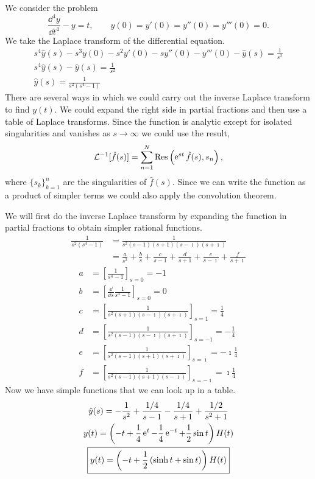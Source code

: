 {%
\begin{Solution}
  \label{solution y''''-y=t}
  We consider the problem
  \[
  \frac{\dd^4 y}{\dd t^4} - y = t, \qquad
  y(0) = y'(0) = y''(0) = y'''(0) = 0.
  \]
  We take the Laplace transform of the differential equation.
  \begin{gather*}
    s^4 \hat{y}(s) - s^3 y(0) - s^2 y'(0) - s y''(0) - y'''(0) - \hat{y}(s)
    = \frac{1}{s^2} \\
    s^4 \hat{y}(s) - \hat{y}(s) = \frac{1}{s^2} \\
    \hat{y}(s) = \frac{1}{s^2 (s^4 - 1)}
  \end{gather*}
  There are several ways in which we could carry out the inverse Laplace
  transform to find $y(t)$.  We could expand the right side in
  partial fractions and then use a table of Laplace transforms.
  Since the function is analytic except for isolated singularities and
  vanishes as $s \to \infty$ we could use the result,
  \[
  \mathcal{L}^{-1} [\hat{f}(s)]
  = \sum_{n = 1}^N \mathop{\mathrm{Res}}\nolimits \left( \mathop{\mathrm{e}}\nolimits^{s t} \hat{f}(s), s_n \right),
  \]
  where $\{s_k\}_{k=1}^n$ are the singularities of $\hat{f}(s)$.
  Since we can write the function as a product of simpler terms we could also
  apply the convolution theorem.

  We will first do the inverse Laplace transform by expanding the function 
  in partial fractions to obtain simpler rational functions.
  \begin{align*}
    \frac{1}{ s^2 (s^4 - 1) }
    &= \frac{1}{ s^2 (s - 1) (s + 1) (s - \imath) (s + \imath) } \\
    &= \frac{a}{s^2} + \frac{b}{s}
    + \frac{c}{ s - 1 } + \frac{d}{ s + 1 }
    + \frac{e}{ s - \imath } + \frac{f}{ s + \imath }
  \end{align*}
  \begin{align*}
    a &= \left[ \frac{1}{s^4 - 1} \right]_{s = 0} = -1 \\
    b &= \left[ \frac{\dd}{\dd s} \frac{1}{s^4 - 1} \right]_{s = 0} = 0 \\
    c &= \left[ \frac{1}{ s^2 (s + 1) (s - \imath) (s + \imath) }
    \right]_{s = 1} = \frac{1}{4} \\
    d &= \left[ \frac{1}{ s^2 (s - 1) (s - \imath) (s + \imath) }
    \right]_{s = -1} = - \frac{1}{4} \\
    e &= \left[ \frac{1}{ s^2 (s - 1) (s + 1) (s + \imath) }
    \right]_{s = \imath} = -\imath \frac{1}{4} \\
    f &= \left[ \frac{1}{ s^2 (s - 1) (s + 1) (s - \imath) }
    \right]_{s = -\imath} = \imath \frac{1}{4}
  \end{align*}
  Now we have simple functions that we can look up in a table.
  \begin{gather*}
    \hat{y}(s) = - \frac{1}{s^2} + \frac{1/4}{s-1} - \frac{1/4}{s+1}
    + \frac{1/2}{s^2 + 1} \\
    y(t) = \left( - t + \frac{1}{4} \mathop{\mathrm{e}}\nolimits^t - \frac{1}{4} \mathop{\mathrm{e}}\nolimits^{-t} + \frac{1}{2} \sin t
    \right) H(t) \\
    \boxed{
      y(t) = \left( - t + \frac{1}{2} \left( \sinh t + \sin t \right)
      \right) H(t)
      }
  \end{gather*}




\end{Solution}}
